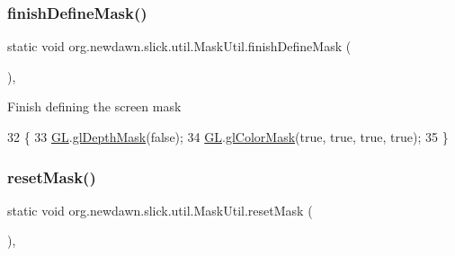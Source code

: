 \subsubsection{\texorpdfstring{finish\+Define\+Mask()}{finishDefineMask()}}
{\footnotesize\ttfamily static void org.\+newdawn.\+slick.\+util.\+Mask\+Util.\+finish\+Define\+Mask (\begin{DoxyParamCaption}{ }\end{DoxyParamCaption})\hspace{0.3cm}{\ttfamily [inline]}, {\ttfamily [static]}}

Finish defining the screen mask 
\begin{DoxyCode}
32                                           \{
33         \mbox{\hyperlink{classorg_1_1newdawn_1_1slick_1_1util_1_1_mask_util_a0a8dc1ea7550e654529a6f92dadea889}{GL}}.\mbox{\hyperlink{interfaceorg_1_1newdawn_1_1slick_1_1opengl_1_1renderer_1_1_s_g_l_a38dbc27d7cec53cf04ff1d98fd8c15e0}{glDepthMask}}(\textcolor{keyword}{false});
34         \mbox{\hyperlink{classorg_1_1newdawn_1_1slick_1_1util_1_1_mask_util_a0a8dc1ea7550e654529a6f92dadea889}{GL}}.\mbox{\hyperlink{interfaceorg_1_1newdawn_1_1slick_1_1opengl_1_1renderer_1_1_s_g_l_a35f9b484d84c168623bc7236152f2d50}{glColorMask}}(\textcolor{keyword}{true}, \textcolor{keyword}{true}, \textcolor{keyword}{true}, \textcolor{keyword}{true});
35     \}
\end{DoxyCode}
\mbox{\label{classorg_1_1newdawn_1_1slick_1_1util_1_1_mask_util_a8d7e56e8716eefd2d771f079c084bf22}} 
\subsubsection{\texorpdfstring{reset\+Mask()}{resetMask()}}
{\footnotesize\ttfamily static void org.\+newdawn.\+slick.\+util.\+Mask\+Util.\+reset\+Mask (\begin{DoxyParamCaption}{ }\end{DoxyParamCaption})\hspace{0.3cm}{\ttfamily [inline]}, {\ttfamily [static]}}

